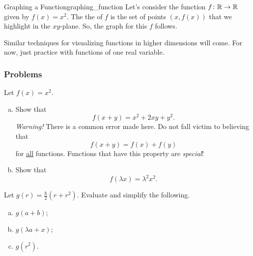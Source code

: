     \begin{ex}{Graphing a Function}{graphing_function}
    Let's consider the function $f\colon \mathbb{R} \to \mathbb{R}$ given by $f(x)=x^2$.  The the  of $f$ is the set of points $(x,f(x))$ that we highlight in the $xy$-plane.  So, the graph for this $f$ follows.
    \begin{center}
    \end{center}
    \end{ex}

    Similar techniques for visualizing functions in higher dimensions will come. For now, just practice with functions of one real variable.

    \subsubsection{Problems}

    \begin{problem}
    Let $f(x)=x^2$.
    \begin{enumerate}[(a)]
        \item Show that
        \[
        f(x+y)=x^2+2xy+y^2.
        \]
        \emph{Warning!} There is a common error made here. Do not fall victim to believing that
        \[
        f(x+y)=f(x)+f(y)
        \]
        for \underline{all} functions.  Functions that have this property are \emph{special}!
        \item Show that
        \[
        f(\lambda x)=\lambda^2x^2.
        \]
    \end{enumerate}
    \end{problem}

    \begin{problem}
    Let $g(r)=\frac{\hbar}{2}(r+r^2)$. Evaluate and simplify the following.
    \begin{enumerate}[(a)]
        \item $g(a+b)$;
        \item $g(\lambda a + x)$;
        \item $g(r^2)$.
    \end{enumerate}
    \end{problem}

